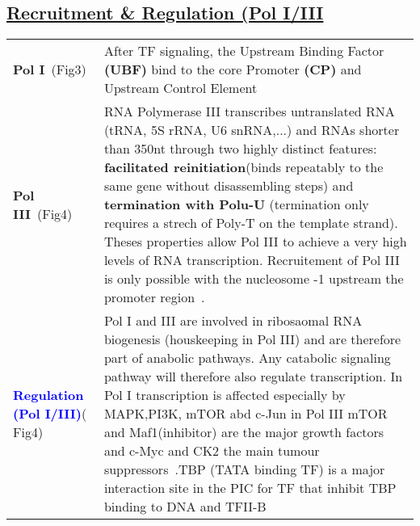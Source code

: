 {\begin{longtable}{p{1in}p{4.8in}}
\end{longtable}

\subsection{\underline{Recruitment \& Regulation (Pol I/III} }
\begin{longtable}{p{1in}p{4.8in}}
\textbf{Pol I}~(Fig3) & 
    After TF signaling, the Upstream Binding Factor \textbf{(UBF)} bind to the core Promoter \textbf{(CP)} and Upstream Control Element\\ 

\textbf{Pol III}~(Fig4) &  
    RNA Polymerase III transcribes untranslated RNA (tRNA, 5S rRNA, U6 snRNA,...) and RNAs shorter than 350nt through two highly distinct features: \textbf{facilitated reinitiation}(binds repeatably to the same gene without disassembling steps) and \textbf{termination with Polu-U} (termination only requires a strech of Poly-T on the template strand). Theses properties allow Pol III to achieve a very high levels of RNA transcription. Recruitement of Pol III is only possible with the nucleosome -1 upstream the promoter region~\citep{Wk4video3}.\\
%
\textbf{\textcolor{blue}{Regulation (Pol I/III)}}( Fig4) &
    Pol I and III are involved in ribosaomal RNA biogenesis (houskeeping in Pol III) and are therefore part of anabolic pathways. Any catabolic signaling pathway will therefore also regulate transcription. In Pol I transcription is affected especially by MAPK,PI3K, mTOR abd c-Jun in Pol III mTOR and Maf1(inhibitor) are the major growth factors and c-Myc and CK2 the main tumour suppressors~\citep{Wk4video3}.TBP (TATA binding TF) is a major interaction site in the  PIC for TF that inhibit TBP binding to DNA and TFII-B\citep[p.466]{pol2}
\\
\end{longtable}
}
